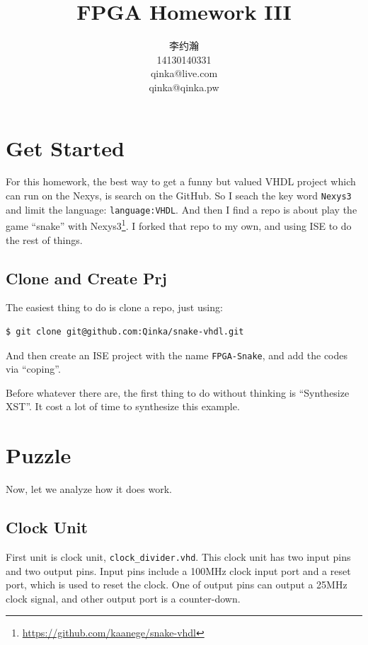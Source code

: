 \documentclass{article}
\title{FPGA Homework III}
\author{李约瀚 \\ 14130140331 \\ qinka@live.com \\ qinka@qinka.pw}
\begin{document}
    \maketitle
    \newpage
    \section{Get Started}
    \label{sec:getstarted}
    
    For this homework, the best way to get a funny but valued VHDL project which can run on the Nexys, is search on the GitHub.
    So I seach the key word \verb|Nexys3| and limit the language: \lstinline|language:VHDL|.
    And then I find a repo is about play the game ``snake'' with Nexys3\footnote{\url{https://github.com/kaanege/snake-vhdl}}.
    I forked that repo to my own, and using ISE to do the rest of things.
    
    \subsection{Clone and Create Prj}
    \label{sec:cloneandcreateprj}
    
    The easiest thing to do is clone a repo, just using:
    \begin{lstlisting}
$ git clone git@github.com:Qinka/snake-vhdl.git
    \end{lstlisting}
    And then create an ISE project with the name \verb|FPGA-Snake|, and add the codes via ``coping''.
    
    Before whatever there are, the first thing to do without thinking is ``Synthesize XST''.
    It cost a lot of time to synthesize this example.
    
    \section{Puzzle}
    \label{sec:puzzle}
    
    Now, let we analyze how it does work.
    
    \subsection{Clock Unit}
    \label{sec:clockunit}

    First unit is clock unit, \verb|clock_divider.vhd|. This clock unit has two input pins and two output pins.
    Input pins include a 100MHz clock input port and a reset port, which is used to reset the clock.
    One of output pins can output a 25MHz clock signal, and other output port is a counter-down.
    
\end{document}
